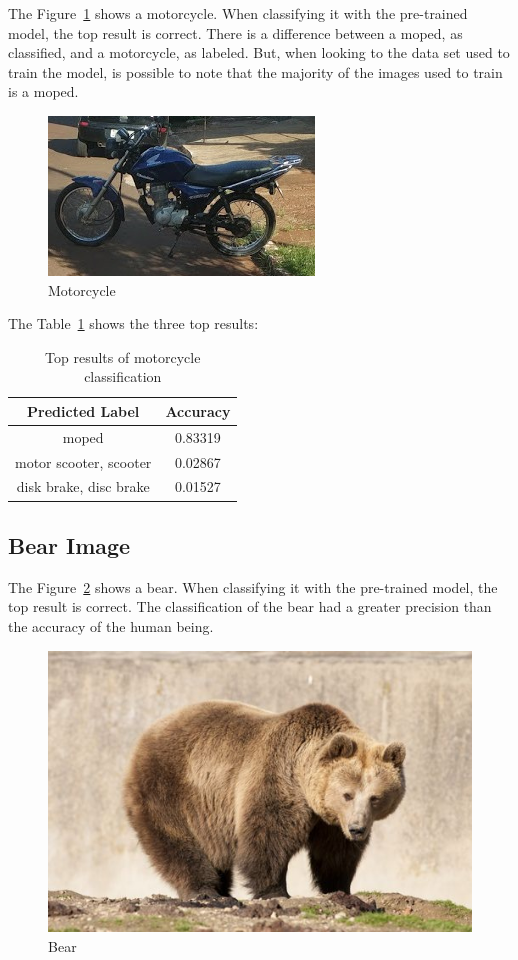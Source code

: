 \documentclass[12pt]{article}
\begin{document}
The Figure~\ref{fig:image2} shows a motorcycle. When classifying it with the pre-trained model, the top result is correct. There is a difference between a moped, as classified, and a motorcycle, as labeled. But, when looking to the data set used to train the model, is possible to note that the majority of the images used to train is a moped.

\begin{figure}[H]
  \centering
  \includegraphics[width=.5\textwidth]{images/moto.jpg}
  \caption{Motorcycle}
  \label{fig:image2}
\end{figure}

The Table~\ref{tab:result2} shows the three top results:

\begin{table}[H]
  \centering
  \caption{Top results of motorcycle classification}
  \begin{tabular}{|c|c|}
    \hline
      Predicted Label & Accuracy \\
    \hline
    moped & 0.83319 \\
    motor scooter, scooter & 0.02867 \\
    disk brake, disc brake & 0.01527 \\
    \hline
  \end{tabular}
  \label{tab:result2}
\end{table}

\subsection{Bear Image}

The Figure~\ref{fig:image3} shows a bear. When classifying it with the pre-trained model, the top result is correct. The classification of the bear had a greater precision than the accuracy of the human being.

\begin{figure}[H]
  \centering
  \includegraphics[width=.5\textwidth]{images/urso.jpg}
  \caption{Bear}
  \label{fig:image3}
\end{figure}
\end{document}
